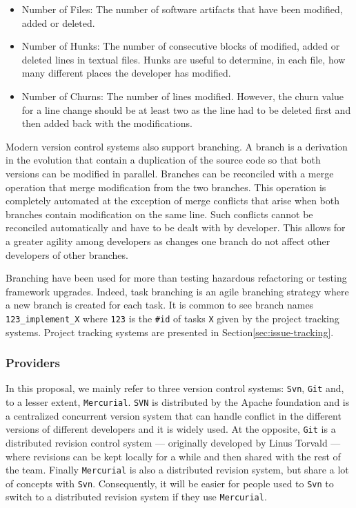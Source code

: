 \begin{itemize}
\item Number of Files: The number of software artifacts that have been modified, added or deleted.
\item Number of Hunks: The number of consecutive blocks of modified, added or deleted lines in textual files. Hunks are useful to determine, in each file, how many different places the developer has modified.
\item Number of Churns:  The number of lines modified. However, the churn value for a line change should be at least two as the line had to be deleted first and then added back with the modifications.
\end{itemize}

Modern version control systems also support branching.
A branch is a derivation in the evolution that contain a duplication of the source code so that both versions can be modified in parallel.
Branches can be reconciled with a merge operation that merge modification from the two branches.
This operation is completely automated at the exception of merge conflicts that arise when both branches contain modification on the same line.
Such conflicts cannot be reconciled automatically and have to be dealt with by developer.
This allows for a greater agility among developers as changes one branch do not affect other developers of other branches.

Branching have been used for more than testing hazardous refactoring or testing framework upgrades.
Indeed, task branching is an agile branching strategy where a new branch is created for each task\cite{MartinFowler2009}.
It is common to see branch names {\tt 123\_implement\_X} where {\tt 123} is the {\tt \#id} of tasks {\tt X} given by the project tracking systems.
Project tracking systems are presented in Section\ref{sec:issue-tracking}.


\subsubsection{Providers\label{sec:revision-provider}}

In this proposal, we mainly refer to three version control systems: {\tt Svn}, {\tt Git} and, to a lesser extent, {\tt Mercurial}.
{\tt SVN} is distributed by the Apache foundation and is a centralized concurrent version system that can handle conflict in the different versions of different developers and it is widely used.
At the opposite, {\tt Git} is a distributed revision control system --- originally developed by Linus Torvald --- where revisions can be kept locally for a while and then shared with the rest of the team.
Finally {\tt Mercurial} is also a distributed revision system, but share a lot of concepts with {\tt Svn}.
Consequently, it will be easier for people used to {\tt Svn} to switch to a distributed revision system if they use {\tt Mercurial}.


